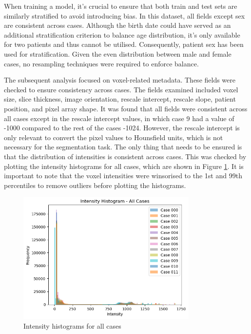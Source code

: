 \documentclass[11pt]{article}
\begin{document}
When training a model, it's crucial to ensure that both train and test sets are similarly stratified to avoid introducing bias. In this dataset, all fields except sex are consistent across cases. Although the birth date could have served as an additional stratification criterion to balance age distribution, it's only available for two patients and thus cannot be utilised. Consequently, patient sex has been used for stratification. Given the even distribution between male and female cases, no resampling techniques were required to enforce balance.

The subsequent analysis focused on voxel-related metadata. These fields were checked to ensure consistency across cases. The fields examined included voxel size, slice thickness, image orientation, rescale intercept, rescale slope, patient position, and pixel array shape. It was found that all fields were consistent across all cases except in the rescale intercept values, in which case 9 had a value of -1000 compared to the rest of the cases -1024. However, the rescale intercept is only relevant to convert the pixel values to Hounsfield units, which is not necessary for the segmentation task. The only thing that needs to be ensured is that the distribution of intensities is consistent across cases. This was checked by plotting the intensity histograms for all cases, which are shown in Figure \ref{fig:intensity_histograms}. It is important to note that the voxel intensities were winsorised to the 1st and 99th percentiles to remove outliers before plotting the histograms.

\begin{figure}[H]
    \centering
    \includegraphics[width=0.8\textwidth]{figs/intensity_hist.png}
    \caption{Intensity histograms for all cases}
    \label{fig:intensity_histograms}
\end{figure}
\end{document}
